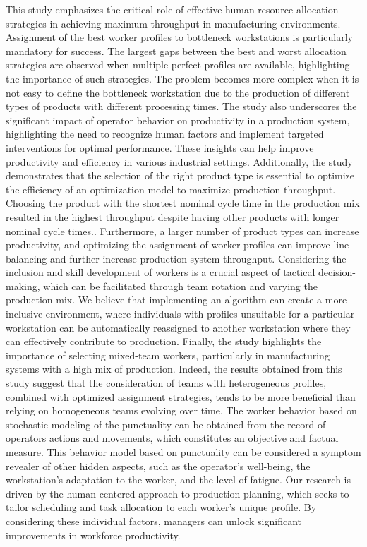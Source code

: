 This study emphasizes the critical role of effective human resource allocation strategies in achieving maximum throughput in manufacturing environments. Assignment of the best worker profiles to bottleneck workstations is particularly mandatory for success. The largest gaps between the best and worst allocation strategies are observed when multiple perfect profiles are available, highlighting the importance of such strategies. The problem becomes more complex when it is not easy to define the bottleneck workstation due to the production of different types of products with different processing times. The study also underscores the significant impact of operator behavior on productivity in a production system, highlighting the need to recognize human factors and implement targeted interventions for optimal performance. These insights can help improve productivity and efficiency in various industrial settings. Additionally, the study demonstrates that the selection of the right product type is essential to optimize the efficiency of an optimization model to maximize production throughput. Choosing the product with the shortest nominal cycle time in the production mix resulted in the highest throughput despite having other products with longer nominal cycle times.. Furthermore, a larger number of product types can increase productivity, and optimizing the assignment of worker profiles can improve line balancing and further increase production system throughput. Considering the inclusion and skill development of workers is a crucial aspect of tactical decision-making, which can be facilitated through team rotation and varying the production mix. We believe that implementing an algorithm can create a more inclusive environment, where individuals with profiles unsuitable for a particular workstation can be automatically reassigned to another workstation where they can effectively contribute to production. Finally, the study highlights the importance of selecting mixed-team workers, particularly in manufacturing systems with a high mix of production. Indeed, the results obtained from this study suggest that the consideration of teams with heterogeneous profiles, combined with optimized assignment strategies, tends to be more beneficial than relying on homogeneous teams evolving over time. The worker behavior based on stochastic modeling of the punctuality can be obtained from the record of operators actions and movements, which constitutes an objective and factual measure. This behavior model based on punctuality can be considered a symptom revealer of other hidden aspects, such as the operator’s well-being, the workstation’s adaptation to the worker, and the level of fatigue. Our research is driven by the human-centered approach to production planning, which seeks to tailor scheduling and task allocation to each worker’s unique profile. By considering these individual factors, managers can unlock significant improvements in workforce productivity.
